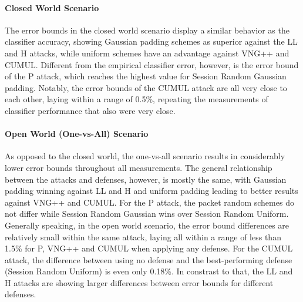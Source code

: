 \documentclass[
	ruledheaders=chapter,
	class=report,
	thesis={type=master, department=inf},
	accentcolor=1c,
	custommargins=true,
	marginpar=false,
	parskip=half-,
	fontsize=11pt,
]{tudapub}
\begin{document}
	\paragraph{Closed World Scenario} The error bounds in the closed world scenario display a similar behavior as the classifier accuracy, showing Gaussian padding schemes as superior against the LL and H attacks, while uniform schemes have an advantage against VNG++ and CUMUL. Different from the empirical classifier error, however, is the error bound of the P attack, which reaches the highest value for Session Random Gaussian padding. Notably, the error bounds of the CUMUL attack are all very close to each other, laying within a range of 0.5\%, repeating the measurements of classifier performance that also were very close.
	
	\paragraph{Open World (One-vs-All) Scenario} As opposed to the closed world, the one-vs-all scenario results in considerably lower error bounds throughout all measurements. The general relationship between the attacks and defenses, however, is mostly the same, with Gaussian padding winning against LL and H and uniform padding leading to better results against VNG++ and CUMUL. For the P attack, the packet random schemes do not differ while Session Random Gaussian wins over Session Random Uniform. Generally speaking, in the open world scenario, the error bound differences are relatively small within the same attack, laying all within a range of less than 1.5\% for P, VNG++ and CUMUL when applying any defense. For the CUMUL attack, the difference between using no defense and the best-performing defense (Session Random Uniform) is even only 0.18\%. In constrast to that, the LL and H attacks are showing larger differences between error bounds for different defenses.
\end{document}
